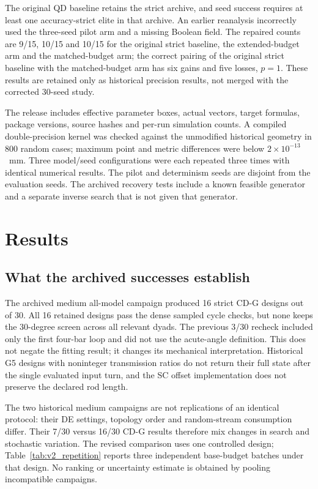 \documentclass[applsci,article,submit,pdftex,moreauthors]{Definitions/mdpi}
\begin{document}
The original QD baseline retains the strict archive, and seed success requires at least one accuracy-strict elite in that archive. An earlier reanalysis incorrectly used the three-seed pilot arm and a missing Boolean field. The repaired counts are 9/15, 10/15 and 10/15 for the original strict baseline, the extended-budget arm and the matched-budget arm; the correct pairing of the original strict baseline with the matched-budget arm has six gains and five losses, $p=1$. These results are retained only as historical precision results, not merged with the corrected 30-seed study.

The release includes effective parameter boxes, actual vectors, target formulas, package versions, source hashes and per-run simulation counts. A compiled double-precision kernel was checked against the unmodified historical geometry in 800 random cases; maximum point and metric differences were below $2\times10^{-13}$~mm. Three model/seed configurations were each repeated three times with identical numerical results. The pilot and determinism seeds are disjoint from the evaluation seeds. The archived recovery tests include a known feasible generator and a separate inverse search that is not given that generator.

\section{Results}
\subsection{What the archived successes establish}\label{sec:historical}
The archived medium all-model campaign produced 16 strict CD-G designs out of 30. All 16 retained designs pass the dense sampled cycle checks, but none keeps the 30-degree screen across all relevant dyads. The previous 3/30 recheck included only the first four-bar loop and did not use the acute-angle definition. This does not negate the fitting result; it changes its mechanical interpretation. Historical G5 designs with noninteger transmission ratios do not return their full state after the single evaluated input turn, and the SC offset implementation does not preserve the declared rod length.

The two historical medium campaigns are not replications of an identical protocol: their DE settings, topology order and random-stream consumption differ. Their 7/30 versus 16/30 CD-G results therefore mix changes in search and stochastic variation. The revised comparison uses one controlled design; Table~\ref{tab:v2_repetition} reports three independent base-budget batches under that design. No ranking or uncertainty estimate is obtained by pooling incompatible campaigns.
\end{document}
